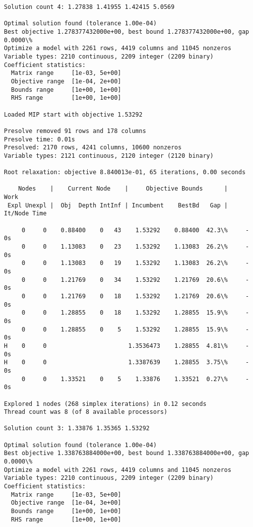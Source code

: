 \documentclass[11pt]{article}
\begin{document}
\begin{Verbatim}[commandchars=\\\{\}]
Solution count 4: 1.27838 1.41955 1.42415 5.0569 

Optimal solution found (tolerance 1.00e-04)
Best objective 1.278377432000e+00, best bound 1.278377432000e+00, gap 0.0000\%
Optimize a model with 2261 rows, 4419 columns and 11045 nonzeros
Variable types: 2210 continuous, 2209 integer (2209 binary)
Coefficient statistics:
  Matrix range     [1e-03, 5e+00]
  Objective range  [1e-04, 2e+00]
  Bounds range     [1e+00, 1e+00]
  RHS range        [1e+00, 1e+00]

Loaded MIP start with objective 1.53292

Presolve removed 91 rows and 178 columns
Presolve time: 0.01s
Presolved: 2170 rows, 4241 columns, 10600 nonzeros
Variable types: 2121 continuous, 2120 integer (2120 binary)

Root relaxation: objective 8.840013e-01, 65 iterations, 0.00 seconds

    Nodes    |    Current Node    |     Objective Bounds      |     Work
 Expl Unexpl |  Obj  Depth IntInf | Incumbent    BestBd   Gap | It/Node Time

     0     0    0.88400    0   43    1.53292    0.88400  42.3\%     -    0s
     0     0    1.13083    0   23    1.53292    1.13083  26.2\%     -    0s
     0     0    1.13083    0   19    1.53292    1.13083  26.2\%     -    0s
     0     0    1.21769    0   34    1.53292    1.21769  20.6\%     -    0s
     0     0    1.21769    0   18    1.53292    1.21769  20.6\%     -    0s
     0     0    1.28855    0   18    1.53292    1.28855  15.9\%     -    0s
     0     0    1.28855    0    5    1.53292    1.28855  15.9\%     -    0s
H    0     0                       1.3536473    1.28855  4.81\%     -    0s
H    0     0                       1.3387639    1.28855  3.75\%     -    0s
     0     0    1.33521    0    5    1.33876    1.33521  0.27\%     -    0s

Explored 1 nodes (268 simplex iterations) in 0.12 seconds
Thread count was 8 (of 8 available processors)

Solution count 3: 1.33876 1.35365 1.53292 

Optimal solution found (tolerance 1.00e-04)
Best objective 1.338763884000e+00, best bound 1.338763884000e+00, gap 0.0000\%
Optimize a model with 2261 rows, 4419 columns and 11045 nonzeros
Variable types: 2210 continuous, 2209 integer (2209 binary)
Coefficient statistics:
  Matrix range     [1e-03, 5e+00]
  Objective range  [1e-04, 3e+00]
  Bounds range     [1e+00, 1e+00]
  RHS range        [1e+00, 1e+00]


\end{Verbatim}
\end{document}
